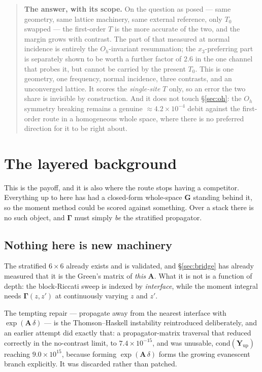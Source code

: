 \documentclass[11pt,a4paper]{article}
\newcommand{\bA}{\mathbf{A}}
\newcommand{\Oh}{O_{h}}
\begin{document}
\begin{quote}
\textbf{The answer, with its scope.}  On the question as posed --- same geometry,
same lattice machinery, same external reference, only $T_0$ swapped --- the
first-order $T$ is the more accurate of the two, and the margin grows with
contrast.  The part of that measured at normal incidence is entirely the
$\Oh$-invariant resummation; the $x_3$-preferring part is separately shown to be
worth a further factor of $2.6$ in the one channel that probes it, but cannot be
carried by the present $T_0$.  This is one geometry, one frequency, normal incidence, three
contrasts, and an unconverged lattice.  It scores the \emph{single-site} $T$
only, so an error the two share is invisible by construction.  And it does not
touch \S\ref{sec:oh}: the $\Oh$ symmetry breaking remains a genuine
$\approx4.2\times10^{-4}$ debit against the first-order route in a homogeneous
whole space, where there is no preferred direction for it to be right about.
\end{quote}

\section{The layered background}\label{sec:layered}

This is the payoff, and it is also where the route stops having a competitor.
Everything up to here has had a closed-form whole-space $\mathbf{G}$ standing
behind it, so the moment method could be scored against something.  Over a stack
there is no such object, and $\boldsymbol\Gamma$ must simply \emph{be} the
stratified propagator.

\subsection{Nothing here is new machinery}

The stratified $6\times6$ already exists and is validated, and
\S\ref{sec:bridge} has already measured that it is the Green's matrix of
\emph{this} $\bA$.  What it is not is a function of depth: the block-Riccati
sweep is indexed by \emph{interface}, while the moment integral needs
$\boldsymbol\Gamma(z,z')$ at continuously varying $z$ and $z'$.

The tempting repair --- propagate away from the nearest interface with
$\exp(\bA\,\delta)$ --- is the Thomson--Haskell instability reintroduced
deliberately, and an earlier attempt did exactly that: a propagator-matrix
traversal that reduced correctly in the no-contrast limit, to
$7.4\times10^{-15}$, and was unusable, $\mathrm{cond}(\mathbf{Y}_{\text{up}})$
reaching $9.0\times10^{15}$, because forming $\exp(\bA\,\delta)$ forms the
growing evanescent branch explicitly.  It was discarded rather than patched.
\end{document}
